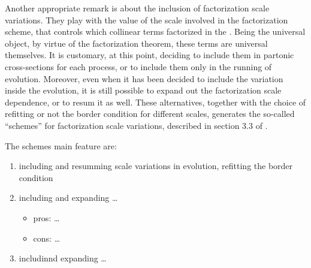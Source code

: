 Another appropriate remark is about the inclusion of factorization scale variations.
They play with the value of the scale involved in the factorization scheme,
that controls which collinear terms factorized in the \pdfs.
Being the \pdfs universal object, by virtue of the factorization theorem, these
terms are universal themselves.
%
It is customary, at this point, deciding to include them in partonic
cross-sections for each process, or to include them only in the running of
\dglap evolution.
%
Moreover, even when it has been decided to include the variation inside the
evolution, it is still possible to expand out the factorization scale
dependence, or to resum it as well.  
%
These alternatives, together with the choice of refitting or not the border
condition for different scales, generates the so-called \enquote{schemes} for
factorization scale variations, described in section 3.3 of
\cite{NNPDF:2019ubu}.

The schemes main feature are:
\begin{enumerate}[label=\Alph*.]
	\item including and resumming scale variations in \dglap evolution,
		refitting the border condition
	\item including and expanding \dots
	\begin{itemize}
		\item pros: \dots
		\item cons: \dots
	\end{itemize}
	\item includinnd expanding \dots
\end{enumerate}
